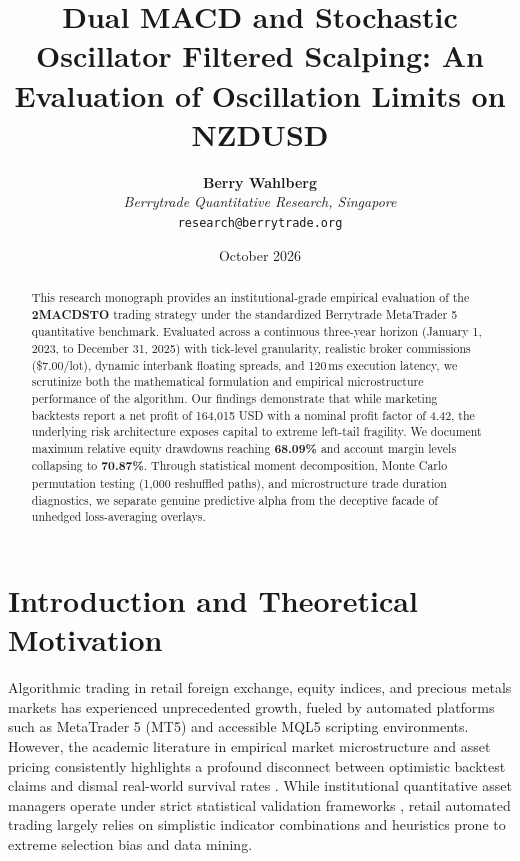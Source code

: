 \documentclass[11pt,a4paper]{article}
\title{\textbf{Dual MACD and Stochastic Oscillator Filtered Scalping: An Evaluation of Oscillation Limits on NZDUSD}}
\author{
    \textbf{Berry Wahlberg} \\
    \textit{Berrytrade Quantitative Research, Singapore} \\
    \texttt{research@berrytrade.org}
}
\date{October 2026}
\begin{document}
\maketitle

\begin{abstract}
This research monograph provides an institutional-grade empirical evaluation of the \textbf{2MACDSTO} trading strategy under the standardized Berrytrade MetaTrader 5 quantitative benchmark. Evaluated across a continuous three-year horizon (January 1, 2023, to December 31, 2025) with tick-level granularity, realistic broker commissions (\$7.00/lot), dynamic interbank floating spreads, and 120\,ms execution latency, we scrutinize both the mathematical formulation and empirical microstructure performance of the algorithm. Our findings demonstrate that while marketing backtests report a net profit of 164,015 USD with a nominal profit factor of 4.42, the underlying risk architecture exposes capital to extreme left-tail fragility. We document maximum relative equity drawdowns reaching \textbf{68.09\%} and account margin levels collapsing to \textbf{70.87\%}. Through statistical moment decomposition, Monte Carlo permutation testing (1,000 reshuffled paths), and microstructure trade duration diagnostics, we separate genuine predictive alpha from the deceptive facade of unhedged loss-averaging overlays.
\end{abstract}

\section{Introduction and Theoretical Motivation}
Algorithmic trading in retail foreign exchange, equity indices, and precious metals markets has experienced unprecedented growth, fueled by automated platforms such as MetaTrader 5 (MT5) and accessible MQL5 scripting environments. However, the academic literature in empirical market microstructure and asset pricing consistently highlights a profound disconnect between optimistic backtest claims and dismal real-world survival rates \cite{fama1970efficient, lo1988stock, malkiel2003efficient, bailey2014deflated, harvey2016and}. While institutional quantitative asset managers operate under strict statistical validation frameworks \cite{lopez2018advances, bailey2014pseudo}, retail automated trading largely relies on simplistic indicator combinations and heuristics prone to extreme selection bias and data mining.
\end{document}
